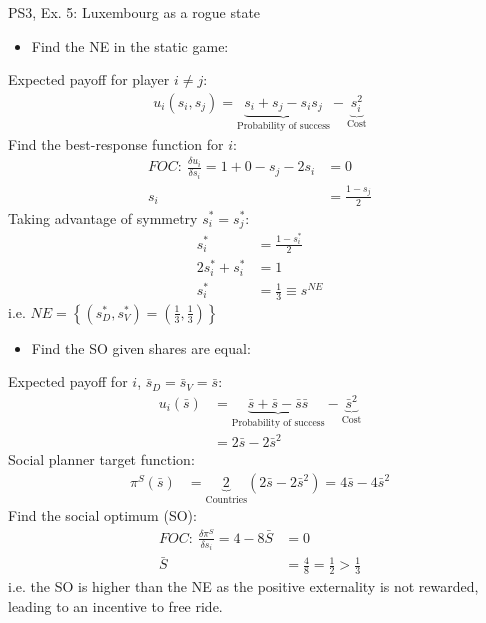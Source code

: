 \begin{frame}{PS3, Ex. 5: Luxembourg as a rogue state}
  \begin{multicols}{2}
    \begin{itemize}
      \item[(a)] Find the NE in the static game:
    \end{itemize}
    Expected payoff for player $i\neq j$:
    \begin{align*}
      u_i(s_i,s_j)=\underbrace{s_i+s_j-s_is_j}_\text{Probability of success}-\underbrace{s_i^2}_\text{Cost}
    \end{align*}
    Find the best-response function for $i$:
    \begin{align*}
      FOC:\ \frac{\delta u_i}{\delta s_i}=1+0-s_j-2s_i&=0\\
       s_i&=\frac{1-s_j}{2}
    \end{align*}
    Taking advantage of symmetry $s_i^{*}=s_j^{*}$:
    \begin{align*}
       s_i^{*}&=\frac{1-s_i^{*}}{2}\\
      2s_i^{*}+s_i^{*}&=1\\
       s_i^{*}&=\frac{1}{3}\equiv s^{NE}
    \end{align*}
    i.e. $NE=\left\{(s_D^{*},s_V^{*})=(\frac{1}{3},\frac{1}{3})\right\}$
  \vfill\null\columnbreak
    \begin{itemize}
      \item[(b)] Find the SO given shares are equal:
    \end{itemize}
    Expected payoff for $i$, $\bar{s}_D=\bar{s}_V=\bar{s}$:
    \begin{align*}
      u_i(\bar{s})&=\underbrace{\bar{s}+\bar{s}-\bar{s}\bar{s}}_\text{Probability of success}-\underbrace{\bar{s}^2}_\text{Cost}\\
                  &=2\bar{s}-2\bar{s}^2
    \end{align*}
    Social planner target function:
    \begin{align*}
      \pi^S(\bar{s})&=\underbrace{2}_\text{Countries}(2\bar{s}-2\bar{s}^2)=4\bar{s}-4\bar{s}^2
    \end{align*}
    Find the social optimum (SO):
    \begin{align*}
      FOC:\ \frac{\delta\pi^S}{\delta s_i}=4-8\bar{S}&=0\\
       \bar{S}&=\frac{4}{8}=\frac{1}{2}>\frac{1}{3}
    \end{align*}
    i.e. the SO is higher than the NE as the positive externality is not rewarded, leading to an incentive to free ride.
  \vfill\null
  \end{multicols}
\end{frame}




